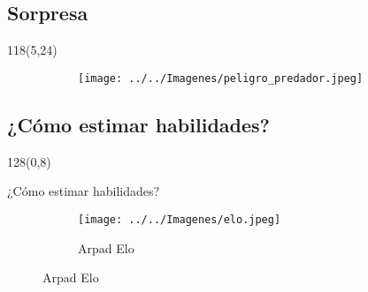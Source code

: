 \documentclass[shownotes]{beamer}
\begin{document}
\subsection{Sorpresa}
\begin{frame}



\begin{textblock}{118}(5,24)
  \begin{figure}[H]     
     \centering \normalsize
     \begin{subfigure}[b]{0.9\textwidth}
       \texttt{[image: ../../Imagenes/peligro\_predador.jpeg]} 
     \end{subfigure}
\end{figure}
\end{textblock}
 
 
 
\end{frame}

\subsection{¿Cómo estimar habilidades?}

\begin{frame}
 \begin{textblock}{128}(0,8)
\begin{center}
 \large ¿Cómo estimar habilidades?
\end{center}
\end{textblock}
\vspace{1.25cm}

  \begin{figure}[H]     
     \centering \normalsize
     \begin{subfigure}[b]{0.4\textwidth}
       \texttt{[image: ../../Imagenes/elo.jpeg]} 
       \caption*{\footnotesize Arpad Elo}
     \end{subfigure}
\end{figure}
\end{frame}
\end{document}
